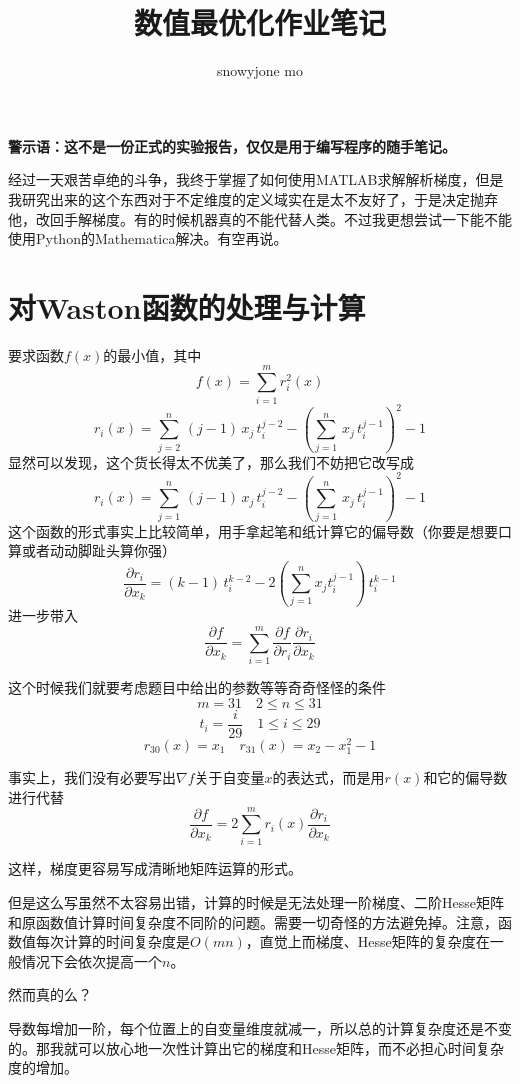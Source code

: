 \documentclass[a4paper, 11pt]{article}
\begin{document}
\title{数值最优化作业笔记}
\author{snowyjone mo}
\maketitle

\textbf{\large 警示语：这不是一份正式的实验报告，仅仅是用于编写程序的随手笔记。}
\vspace{10pt}

经过一天艰苦卓绝的斗争，我终于掌握了如何使用MATLAB求解解析梯度，但是我研究出来的这个东西对于不定维度的定义域实在是太不友好了，于是决定抛弃他，改回手解梯度。有的时候机器真的不能代替人类。不过我更想尝试一下能不能使用Python的Mathematica解决。有空再说。

\section{对Waston函数的处理与计算}

要求函数$f(x)$的最小值，其中
\[f(x)=\sum_{i=1}^m r_i^2(x)\]
\[r_i(x)=\sum_{j=2}^n\,(j-1)\,x_j\,t_i^{j-2}-\left(\sum_{j=1}^n\,x_j\,t_i^{j-1}\right)^2-1\]
显然可以发现，这个货长得太不优美了，那么我们不妨把它改写成
\[r_i(x)=\sum_{j=1}^n\,(j-1)\,x_j\,t_i^{j-2}-\left(\sum_{j=1}^n\,x_j\,t_i^{j-1}\right)^2-1\]
这个函数的形式事实上比较简单，用手拿起笔和纸计算它的偏导数（你要是想要口算或者动动脚趾头算你强）
\[\frac{\partial r_i}{\partial x_k}=(k-1)\,t_i^{k-2}-2\left(\sum_{j=1}^nx_jt_i^{j-1}\right)\,t_i^{k-1}\]
进一步带入
\[\frac{\partial f}{\partial x_k}=\sum_{i=1}^m\frac{\partial f}{\partial r_i}\frac{\partial r_i}{\partial x_k}\]

这个时候我们就要考虑题目中给出的参数等等奇奇怪怪的条件
\[m=31\quad 2\le n\le 31\]
\[t_i=\frac{i}{29}\quad 1\le i\le 29\]
\[r_{30}(x)=x_1\quad r_{31}(x)=x_2-x_1^2-1\]

事实上，我们没有必要写出$\nabla f$关于自变量$x$的表达式，而是用$r(x)$和它的偏导数进行代替
\[\frac{\partial f}{\partial x_k}=2\sum_{i=1}^m r_i(x)\frac{\partial r_i}{\partial x_k}\]

这样，梯度更容易写成清晰地矩阵运算的形式。

但是这么写虽然不太容易出错，计算的时候是无法处理一阶梯度、二阶Hesse矩阵和原函数值计算时间复杂度不同阶的问题。需要一切奇怪的方法避免掉。注意，函数值每次计算的时间复杂度是$O(mn)$，直觉上而梯度、Hesse矩阵的复杂度在一般情况下会依次提高一个$n$。

然而真的么？

导数每增加一阶，每个位置上的自变量维度就减一，所以总的计算复杂度还是不变的。那我就可以放心地一次性计算出它的梯度和Hesse矩阵，而不必担心时间复杂度的增加。
\end{document}
